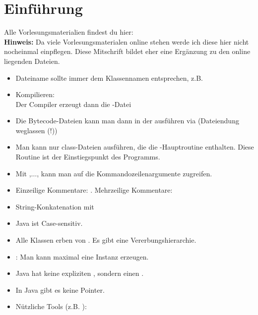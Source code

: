 
\chapter{Einführung}
Alle Vorlesungsmaterialien findest du hier:\\
\nl
\textbf{Hinweis:} Da viele Vorlesungsmaterialen online stehen werde ich diese hier nicht nocheinmal einpflegen.
Diese Mitschrift bildet eher eine Ergänzung zu den online liegenden Dateien.

\begin{itemize}
	\item Dateiname sollte immer dem Klassennamen entsprechen, z.B. 
	\item Kompilieren: \\
	Der Compiler erzeugt dann die -Datei 
	\item Die Bytecode-Dateien kann man dann in der  ausführen via  (Dateiendung weglassen (!))
	\item Man kann nur class-Dateien ausführen, die die -Hauptroutine enthalten.
	Diese Routine ist der Einstiegspunkt des Programms.
	\item Mit ,$\ldots$, kann man auf die Kommandozeilenargumente zugreifen.
	\item Einzeilige Kommentare: . Mehrzeilige Kommentare: \code{/*$\ldots$*/}
	\item String-Konkatenation mit \code{+}
	\item Java ist Case-sensitiv.
	\item Alle Klassen erben von . 
	Es gibt eine Vererbungshierarchie.
	\item {}: Man kann maximal eine Instanz erzeugen.
	\item Java hat keine expliziten , sondern einen .
	\item In Java gibt es keine Pointer.
	\item Nützliche Tools (z.B. ):
\end{itemize}

